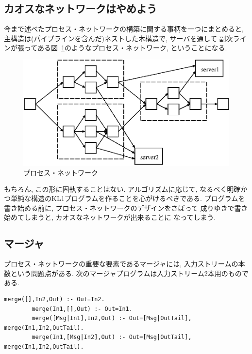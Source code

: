 \documentclass[a4,titlepage]{jsreport}
\newenvironment{program}{\begin{quote}}{\end{quote}}
\begin{document}
\subsection{カオスなネットワークはやめよう}
今まで述べたプロセス・ネットワークの構築に関する事柄を一つにまとめると, 
主構造は(パイプラインを含んだ)ネストした木構造で, サーバを通して
副次ラインが張ってある図~\ref{network}のようなプロセス・ネットワーク, 
ということになる.  

\begin{figure}
\begin{center}
\includegraphics{fig/network.eps}
\caption{プロセス・ネットワーク}
\label{network}
\end{center}
\end{figure}

もちろん, この形に固執することはない.  アルゴリズムに応じて, 
なるべく明確かつ単純な構造のKL1プログラムを作ることを心がけるべきである.  
プログラムを書き始める前に, プロセス・ネットワークのデザインをさぼって 
成りゆきで書き始めてしまうと, カオスなネットワークが出来ることに
なってしまう.  

\subsection{マージャ}
プロセス・ネットワークの重要な要素であるマージャには, 
入力ストリームの本数という問題点がある.  
次のマージャプログラムは入力ストリーム2本用のものである.  

\begin{Verbatim}[baselinestretch=0.8]
        merge([],In2,Out) :- Out=In2.
        merge(In1,[],Out) :- Out=In1.
        merge([Msg|In1],In2,Out) :- Out=[Msg|OutTail], merge(In1,In2,OutTail).
        merge(In1,[Msg|In2],Out) :- Out=[Msg|OutTail], merge(In1,In2,OutTail).
\end{Verbatim}
\end{document}

